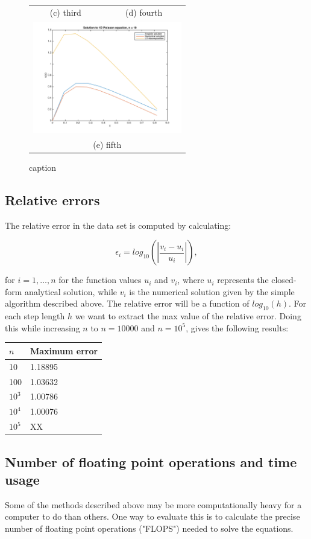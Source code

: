 \documentclass{article}
\begin{document}
\begin{multicols}{2}
\begin{figure}
\begin{tabular}{cc}
(c) third & (d) fourth \\[6pt]
\multicolumn{2}{c}{\includegraphics[width=65mm]{Plot_n10.png} }\\
\multicolumn{2}{c}{(e) fifth}
\end{tabular}
\caption{caption}
\end{figure}


\subsection{Relative errors}

The relative error in the data set is computed by calculating:

\begin{equation}
   \epsilon_i=log_{10}\left(\left|\frac{v_i-u_i}
                 {u_i}\right|\right),
\end{equation}

\noindent for $i = 1, \dots, n$ for the function values $u_i$ and $v_i$, where $u_i$ represents the closed-form analytical solution, while $v_i$ is the numerical solution given by the simple algorithm described above. The relative error will be a function of $log_{10}(h)$. For each step length $h$ we want to extract the max value of the relative error. Doing this while increasing $n$ to $n=10000$ and $n=10^5$, gives the following results:

\begin{center}
\begin{tabular}{ l l }\hline
	$n$ 		&Maximum error \\ \hline
	10 		& 1.18895 \\
	100 		& 1.03632 \\
	$10^3$ 	& 1.00786 \\
	$10^4$ 	& 1.00076 \\
	$10^5$ 	&XX\\
	\hline
\end{tabular}
\end{center}

\subsection{Number of floating point operations and time usage}
Some of the methods described above may be more computationally heavy for a computer to do than others. One way to evaluate this is to calculate the precise number of floating point operations ("FLOPS") needed to solve the equations.


\end{multicols}
\end{document}
